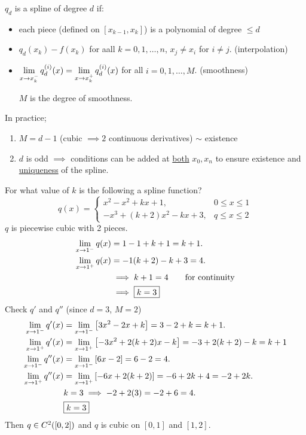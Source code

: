 \documentclass[]{article}
\begin{document}
\begin{definition}
	$q_d$ is a spline of degree $d$ if:
	\begin{itemize}
		\item each piece (defined on $[x_{k-1},x_k]$) is a polynomial of degree $\leq d$
		\item $q_d(x_k) - f(x_k)$ for aall $k=0,1,\dots,n$, $x_j\neq x_i$ for $i\neq j$. (interpolation)
		\item $\displaystyle\lim_{x\rightarrow x_k^-} q_d^{(i)}(x) = \lim_{x\rightarrow x_k^+} q_d^{(i)}(x)$ for all $i=0,1,\dots,M$. (smoothness) 
			
			$M$ is the degree of smoothness.
	\end{itemize}
	In practice;
	\begin{enumerate}
		\item $M=d-1$ (cubic $\implies 2$ continuous derivatives) $\sim$ existence
		\item $d$ is odd $\implies$ conditions can be added at \ul{both} $x_0,x_n$ to ensure existence and \ul{uniqueness} of the spline.
	\end{enumerate}
\end{definition}
\begin{example}
	For what value of $k$ is the following a spline function?
	$$ q(x) = \begin{cases} x^2-x^2+kx+1, & 0\leq x\leq1 \\ -x^3+(k+2)x^2-kx+3, & q\leq x\leq2 \end{cases} $$
	$q$ is piecewise cubic with 2 pieces.
	\begin{align*}
		\lim_{x\rightarrow1^-} q(x) &= 1-1+k+1 = k+1. \\
		\lim_{x\rightarrow1^+} q(x) &= -1 (k+2)-k+3 = 4. \\
							&\implies k+1 = 4 \qquad \text{for continuity} \\
							&\implies \fbox{$k = 3$}
	\end{align*}
	Check $q'$ and $q''$ (since $d=3$, $M=2$)
	\begin{align*}
		\lim_{x\rightarrow1^-} q'(x) &= \lim_{x\rightarrow1^-} \left[ 3x^2-2x+k\right] = 3-2+k = k+1. \\
		\lim_{x\rightarrow1^+} q'(x) &= \lim_{x\rightarrow1^+} \left[-3x^2+2(k+2)x-k\right]=-3+2(k+2)-k=k+1 \\
		\lim_{x\rightarrow1^-}q''(x) &= \lim_{x\rightarrow1^-} \left[ 6x-2\right] = 6-2=4. \\
		\lim_{x\rightarrow1^+}q''(x) &= \lim_{x\rightarrow1^+} \left[-6x+2(k+2)\right]=-6+2k+4=-2+2k. \\
							 & k=3 \implies -2+2(3) = -2+6 = 4. \\
							 & \fbox{$k=3$}
	\end{align*}
	Then $q\in C^{2}({[}0,2{]})$ and $q$ is cubic on $[0,1]$ and $[1,2]$.
\end{example}
\end{document}
